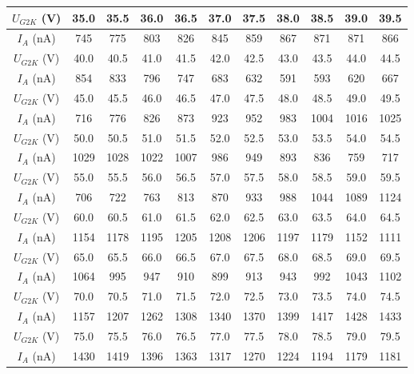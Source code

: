 \documentclass[10pt,a4paper]{ctexart}
\begin{document}
\begin{table}[H]
\begin{tabular}{|c|c|c|c|c|c|c|c|c|c|c|}
        \hline
        $U_{G2K}$ (V) & 35.0 & 35.5 & 36.0 & 36.5 & 37.0 & 37.5 & 38.0 & 38.5 & 39.0 & 39.5 \\ 
        \hline
        $I_A$ (nA)     & 745  & 775  & 803  & 826  & 845  & 859  & 867  & 871  & 871  & 866  \\ 
        \hline
        $U_{G2K}$ (V) & 40.0 & 40.5 & 41.0 & 41.5 & 42.0 & 42.5 & 43.0 & 43.5 & 44.0 & 44.5 \\ 
        \hline
        $I_A$ (nA)     & 854  & 833  & 796  & 747  & 683  & 632  & 591  & 593  & 620  & 667  \\ 
        \hline
        $U_{G2K}$ (V) & 45.0 & 45.5 & 46.0 & 46.5 & 47.0 & 47.5 & 48.0 & 48.5 & 49.0 & 49.5 \\ 
        \hline
        $I_A$ (nA)     & 716  & 776  & 826  & 873  & 923  & 952  & 983  & 1004 & 1016 & 1025 \\ 
        \hline
        $U_{G2K}$ (V) & 50.0 & 50.5 & 51.0 & 51.5 & 52.0 & 52.5 & 53.0 & 53.5 & 54.0 & 54.5 \\ 
        \hline
        $I_A$ (nA)     & 1029 & 1028 & 1022 & 1007 & 986  & 949  & 893  & 836  & 759  & 717  \\ 
        \hline
        $U_{G2K}$ (V) & 55.0 & 55.5 & 56.0 & 56.5 & 57.0 & 57.5 & 58.0 & 58.5 & 59.0 & 59.5 \\ 
        \hline
        $I_A$ (nA)     & 706  & 722  & 763  & 813  & 870  & 933  & 988  & 1044 & 1089 & 1124 \\ 
        \hline
        $U_{G2K}$ (V) & 60.0 & 60.5 & 61.0 & 61.5 & 62.0 & 62.5 & 63.0 & 63.5 & 64.0 & 64.5 \\ 
        \hline
        $I_A$ (nA)     & 1154 & 1178 & 1195 & 1205 & 1208 & 1206 & 1197 & 1179 & 1152 & 1111 \\ 
        \hline
        $U_{G2K}$ (V) & 65.0 & 65.5 & 66.0 & 66.5 & 67.0 & 67.5 & 68.0 & 68.5 & 69.0 & 69.5 \\ 
        \hline
        $I_A$ (nA)     & 1064 & 995  & 947  & 910  & 899  & 913  & 943  & 992  & 1043 & 1102 \\ 
        \hline
        $U_{G2K}$ (V) & 70.0 & 70.5 & 71.0 & 71.5 & 72.0 & 72.5 & 73.0 & 73.5 & 74.0 & 74.5 \\ 
        \hline
        $I_A$ (nA)     & 1157 & 1207 & 1262 & 1308 & 1340 & 1370 & 1399 & 1417 & 1428 & 1433 \\ 
        \hline
        $U_{G2K}$ (V) & 75.0 & 75.5 & 76.0 & 76.5 & 77.0 & 77.5 & 78.0 & 78.5 & 79.0 & 79.5 \\ 
        \hline
        $I_A$ (nA)     & 1430 & 1419 & 1396 & 1363 & 1317 & 1270 & 1224 & 1194 & 1179 & 1181 \\ 

\end{tabular}
\end{table}
\end{document}
